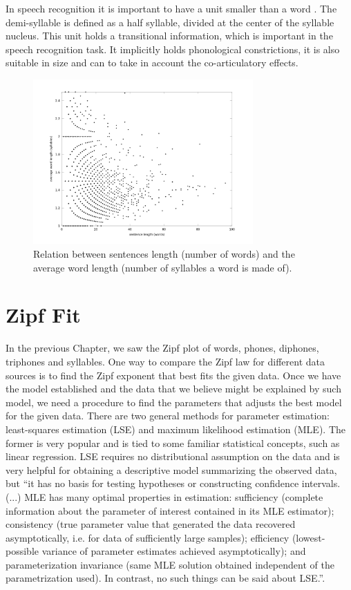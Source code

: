 In speech recognition it is important to have a unit smaller than a word \citep{Shoup1988}. The demi-syllable is defined
as a half syllable, divided at the center of the syllable nucleus. This unit holds a transitional information,
which is important in the speech recognition task. It implicitly holds phonological constrictions, it is 
also suitable in size and can to take in account the co-articulatory effects.

\begin{figure}[h!]
\centering
\includegraphics[width=0.75\textwidth]{images/ulysses_words_sentence_word_length_syllables_z100.png}
\caption{Relation between sentences length (number of words) and the average word length (number of syllables a word is made of).}
\label{fig:ulysses_words_sentence_word_length_syllables_z100}
\end{figure} 



%
%
%
\section{Zipf Fit}
In the previous Chapter, we saw the Zipf plot of words, phones, diphones, triphones and syllables.
One way to compare the Zipf law for different data sources is to find the Zipf exponent that best
fits the given data. Once we have the model established and the data that we believe might be explained
by such model, we need a procedure to find the parameters that adjusts the best model for the given data.
There are two general methods for parameter estimation: least-squares estimation (LSE) and maximum likelihood 
estimation (MLE). The former is very popular and is tied to some familiar statistical concepts, such as linear
regression. LSE requires no distributional assumption on the data and is very helpful for obtaining a
descriptive model summarizing the observed data, but ``it has no basis for testing hypotheses or constructing
confidence intervals. (...) MLE has many optimal properties in estimation: sufficiency (complete information about 
the parameter of interest contained in its MLE estimator); consistency (true parameter value that generated the
data recovered asymptotically, i.e. for data of sufficiently large samples); efficiency (lowest-possible variance 
of parameter estimates achieved asymptotically); and parameterization invariance (same MLE solution obtained 
independent of the parametrization used). In contrast, no such things can be said about LSE.''\citep{myung2003}.

